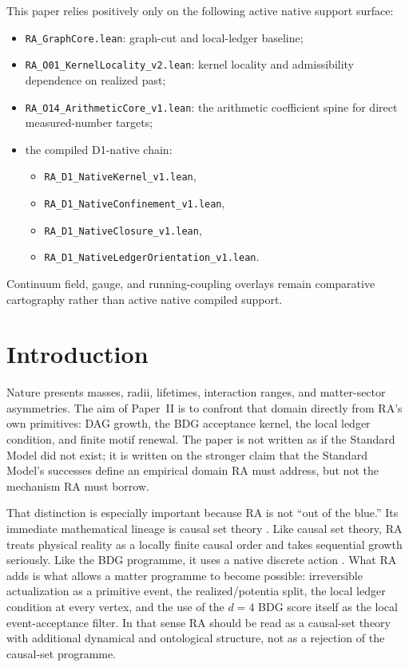 \documentclass[11pt]{article}
\begin{document}
\begin{tcolorbox}[title=Active Native Support Surface Used Positively,colback=gray!5,colframe=gray!60]
This paper relies positively only on the following active native support surface:
\begin{itemize}[nosep]
    \item \texttt{RA\_GraphCore.lean}: graph-cut and local-ledger baseline;
    \item \texttt{RA\_O01\_KernelLocality\_v2.lean}: kernel locality and admissibility dependence on realized past;
    \item \texttt{RA\_O14\_ArithmeticCore\_v1.lean}: the arithmetic coefficient spine for direct measured-number targets;
    \item the compiled D1-native chain:
    \begin{itemize}[nosep]
        \item \texttt{RA\_D1\_NativeKernel\_v1.lean},
        \item \texttt{RA\_D1\_NativeConfinement\_v1.lean},
        \item \texttt{RA\_D1\_NativeClosure\_v1.lean},
        \item \texttt{RA\_D1\_NativeLedgerOrientation\_v1.lean}.
    \end{itemize}
\end{itemize}
Continuum field, gauge, and running-coupling overlays remain comparative cartography rather than active native compiled support.
\end{tcolorbox}


\section{Introduction}

Nature presents masses, radii, lifetimes, interaction ranges, and matter-sector asymmetries. The aim of Paper~II is to confront that domain directly from RA's own primitives: DAG growth, the BDG acceptance kernel, the local ledger condition, and finite motif renewal. The paper is not written as if the Standard Model did not exist; it is written on the stronger claim that the Standard Model's successes define an empirical domain RA must address, but not the mechanism RA must borrow.

That distinction is especially important because RA is not ``out of the blue.'' Its immediate mathematical lineage is causal set theory \cite{Bombelli1987,Sorkin1997,Rideout2000}. Like causal set theory, RA treats physical reality as a locally finite causal order and takes sequential growth seriously. Like the BDG programme, it uses a native discrete action \cite{Benincasa2010,Dowker2013}. What RA adds is what allows a matter programme to become possible: irreversible actualization as a primitive event, the realized/potentia split, the local ledger condition at every vertex, and the use of the $d=4$ BDG score itself as the local event-acceptance filter. In that sense RA should be read as a causal-set theory with additional dynamical and ontological structure, not as a rejection of the causal-set programme.
\end{document}
